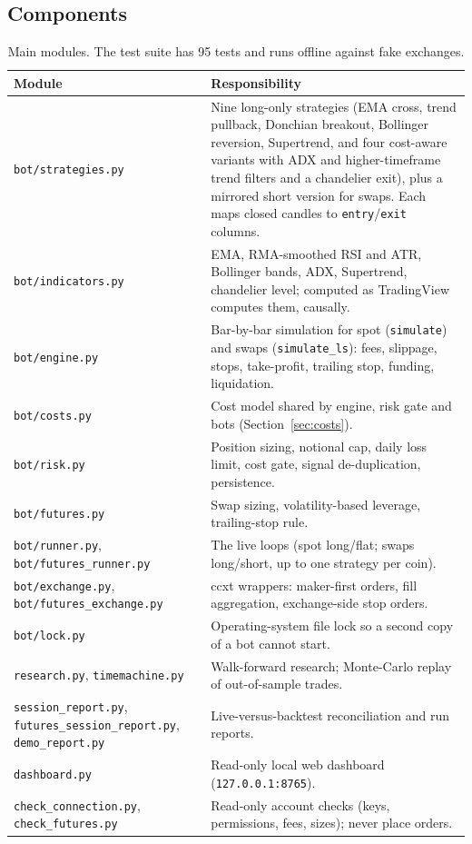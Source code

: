 \documentclass[11pt,a4paper]{article}
\newcommand{\code}[1]{\texttt{\small #1}}
\begin{document}
\subsection{Components}
\begin{table}[h]
\centering\small
\begin{tabularx}{\textwidth}{@{}lL@{}}
\toprule
Module & Responsibility \\
\midrule
\code{bot/strategies.py} & Nine long-only strategies (EMA cross, trend pullback, Donchian
breakout, Bollinger reversion, Supertrend, and four cost-aware variants with ADX and
higher-timeframe trend filters and a chandelier exit), plus a mirrored short version for swaps.
Each maps closed candles to \code{entry}/\code{exit} columns. \\
\code{bot/indicators.py} & EMA, RMA-smoothed RSI and ATR, Bollinger bands, ADX, Supertrend,
chandelier level; computed as TradingView computes them, causally. \\
\code{bot/engine.py} & Bar-by-bar simulation for spot (\code{simulate}) and swaps
(\code{simulate\_ls}): fees, slippage, stops, take-profit, trailing stop, funding, liquidation. \\
\code{bot/costs.py} & Cost model shared by engine, risk gate and bots (Section~\ref{sec:costs}). \\
\code{bot/risk.py} & Position sizing, notional cap, daily loss limit, cost gate, signal
de-duplication, persistence. \\
\code{bot/futures.py} & Swap sizing, volatility-based leverage, trailing-stop rule. \\
\code{bot/runner.py}, \code{bot/futures\_runner.py} & The live loops (spot long/flat; swaps
long/short, up to one strategy per coin). \\
\code{bot/exchange.py}, \code{bot/futures\_exchange.py} & ccxt wrappers: maker-first orders,
fill aggregation, exchange-side stop orders. \\
\code{bot/lock.py} & Operating-system file lock so a second copy of a bot cannot start. \\
\code{research.py}, \code{timemachine.py} & Walk-forward research; Monte-Carlo replay of
out-of-sample trades. \\
\code{session\_report.py}, \code{futures\_session\_report.py}, \code{demo\_report.py} &
Live-versus-backtest reconciliation and run reports. \\
\code{dashboard.py} & Read-only local web dashboard (\code{127.0.0.1:8765}). \\
\code{check\_connection.py}, \code{check\_futures.py} & Read-only account checks (keys,
permissions, fees, sizes); never place orders. \\
\bottomrule
\end{tabularx}
\caption{Main modules. The test suite has 95 tests and runs offline against fake exchanges.}
\end{table}
\end{document}
